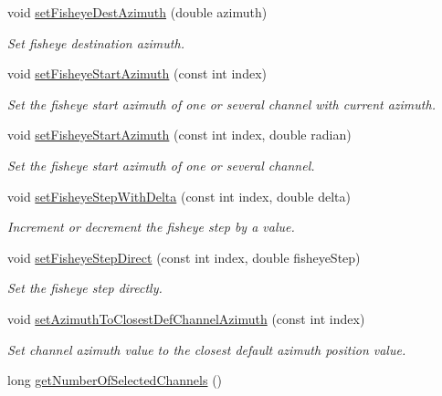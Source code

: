 \begin{DoxyCompactItemize}
void \hyperlink{class_hoa2_d_1_1_channel_manager_a414509401238271014fc94f2104b18e9}{set\-Fisheye\-Dest\-Azimuth} (double azimuth)
\begin{DoxyCompactList}\small\item\em Set fisheye destination azimuth. \end{DoxyCompactList}\item 
void \hyperlink{class_hoa2_d_1_1_channel_manager_aef32accb90db567196964011052d9a66}{set\-Fisheye\-Start\-Azimuth} (const int index)
\begin{DoxyCompactList}\small\item\em Set the fisheye start azimuth of one or several channel with current azimuth. \end{DoxyCompactList}\item 
void \hyperlink{class_hoa2_d_1_1_channel_manager_a51de934826a79149023432ee173338c1}{set\-Fisheye\-Start\-Azimuth} (const int index, double radian)
\begin{DoxyCompactList}\small\item\em Set the fisheye start azimuth of one or several channel. \end{DoxyCompactList}\item 
void \hyperlink{class_hoa2_d_1_1_channel_manager_a8915189ac60c4a5c36c8684984572bb4}{set\-Fisheye\-Step\-With\-Delta} (const int index, double delta)
\begin{DoxyCompactList}\small\item\em Increment or decrement the fisheye step by a value. \end{DoxyCompactList}\item 
void \hyperlink{class_hoa2_d_1_1_channel_manager_a8fbac19eb1cd9889dfc9c6e83479e708}{set\-Fisheye\-Step\-Direct} (const int index, double fisheye\-Step)
\begin{DoxyCompactList}\small\item\em Set the fisheye step directly. \end{DoxyCompactList}\item 
void \hyperlink{class_hoa2_d_1_1_channel_manager_a00a8b1738ddf7b222209b6ff0b2b34f5}{set\-Azimuth\-To\-Closest\-Def\-Channel\-Azimuth} (const int index)
\begin{DoxyCompactList}\small\item\em Set channel azimuth value to the closest default azimuth position value. \end{DoxyCompactList}\item 
long \hyperlink{class_hoa2_d_1_1_channel_manager_a0f33fda180a50a3b2a144d62801b0f56}{get\-Number\-Of\-Selected\-Channels} ()

\end{DoxyCompactItemize}
